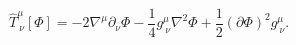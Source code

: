 \begin{equation}\label{hat_dilaton_stress}
{\hat{T}}^{\mu}_{\ \nu} [\Phi]= -2\nabla^{\mu} \partial_{\nu} \Phi
-{\frac{1}{4}} g^{\mu}_{\ \nu} \nabla^2\Phi + {\frac{1}{2}}
(\partial\Phi)^2 g^{\mu}_{\ \nu} .
\end{equation}

